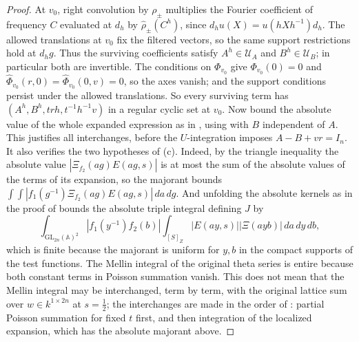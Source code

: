 \documentclass[11pt,oneside,notitlepage]{book}
\numberwithin{equation}{section}
\theoremstyle{plain}
\theoremstyle{definition}
\newcommand{\A}{\mathbb{A}}
\newcommand{\GL}{\mathrm{GL}}
\begin{document}
\begin{proof}
At $v_0$, right convolution by $\rho_\pm$ multiplies the Fourier coefficient of frequency $C$ evaluated at $d_h$ by $\widehat\rho_\pm(C^h)$, since $d_hu(X)=u(hXh^{-1})d_h$. The allowed translations at $v_0$ fix the filtered vectors, so the same support restrictions hold at $d_hg$. Thus the surviving coefficients satisfy $A^h\in\mathcal U_A$ and $B^h\in\mathcal U_B$; in particular both are invertible. The conditions on $\Phi_{v_0}$ give $\Phi_{v_0}(0)=0$ and $\widehat\Phi_{v_0}(r,0)=\widehat\Phi_{v_0}(0,v)=0$, so the axes vanish; and the support conditions persist under the allowed translations. So every surviving term has $(A^h,B^h,trh,t^{-1}h^{-1}v)$ in a regular cyclic set at $v_0$. Now bound the absolute value of the whole expanded expression as in , using  with $B$ independent of $A$. This justifies all interchanges, before the $U$-integration imposes $A-B+vr=I_n$. It also verifies the two hypotheses of (c). Indeed, by the triangle inequality the absolute value $|\Xi_{f_2}(ag)E(ag,s)|$ is at most the sum of the absolute values of the terms of its expansion, so the majorant bounds $\int\int|f_1(g^{-1})\Xi_{f_2}(ag)E(ag,s)|\,da\,dg$. And unfolding the absolute kernels as in the proof of  bounds the absolute triple integral defining $J$ by
\[\int_{\GL_{2n}(\A)^2}|f_1(y^{-1})f_2(b)|\int_{[S]_Z}|E(ay,s)||\Xi(ayb)|\,da\,dy\,db,\]
which is finite because the majorant is uniform for $y,b$ in the compact supports of the test functions. The Mellin integral of the original theta series is entire because both constant terms in Poisson summation vanish. This does not mean that the Mellin integral may be interchanged, term by term, with the original lattice sum over $w\in k^{1\times2n}$ at $s=\frac12$; the interchanges are made in the order of : partial Poisson summation for fixed $t$ first, and then integration of the localized expansion, which has the absolute majorant above.
\end{proof}
\end{document}
